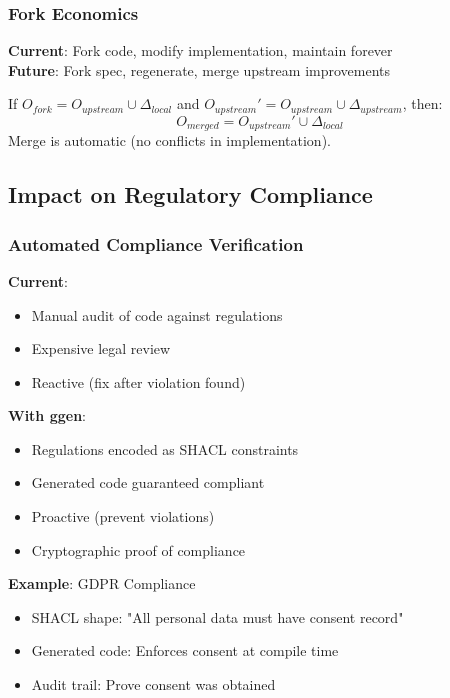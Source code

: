 \subsubsection{Fork Economics}

\textbf{Current}: Fork code, modify implementation, maintain forever \\
\textbf{Future}: Fork spec, regenerate, merge upstream improvements

\begin{theorem}
    If $O_{fork} = O_{upstream} \cup \Delta_{local}$ and $O_{upstream}' = O_{upstream} \cup \Delta_{upstream}$, then:
    \begin{equation}
        O_{merged} = O_{upstream}' \cup \Delta_{local}
    \end{equation}
    Merge is automatic (no conflicts in implementation).
\end{theorem}

\subsection{Impact on Regulatory Compliance}

\subsubsection{Automated Compliance Verification}

\textbf{Current}:
\begin{itemize}
    \item Manual audit of code against regulations
    \item Expensive legal review
    \item Reactive (fix after violation found)
\end{itemize}

\textbf{With ggen}:
\begin{itemize}
    \item Regulations encoded as SHACL constraints
    \item Generated code guaranteed compliant
    \item Proactive (prevent violations)
    \item Cryptographic proof of compliance
\end{itemize}

\textbf{Example}: GDPR Compliance
\begin{itemize}
    \item SHACL shape: "All personal data must have consent record"
    \item Generated code: Enforces consent at compile time
    \item Audit trail: Prove consent was obtained
\end{itemize}

